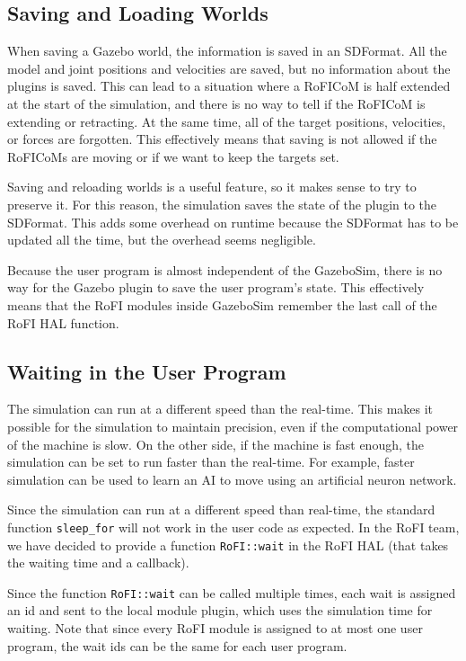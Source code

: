 \documentclass[
  printed, %
  color,   %
  notable, %
  oneside, %
  nolof,   %
  nolot,   %
  nocover,
]{fithesis3}
\newcommand{\code}[1]{\texttt{#1}}
\begin{document}
\subsection{Saving and Loading Worlds}

When saving a Gazebo world, the information is saved in an SDFormat.
All the model and joint positions and velocities are saved, but no information about the plugins is saved.
This can lead to a situation where a RoFICoM is half extended at the start of the simulation, and there is no way to tell if the RoFICoM is extending or retracting.
At the same time, all of the target positions, velocities, or forces are forgotten.
This effectively means that saving is not allowed if the RoFICoMs are moving or if we want to keep the targets set.

Saving and reloading worlds is a useful feature, so it makes sense to try to preserve it.
For this reason, the simulation saves the state of the plugin to the SDFormat.
This adds some overhead on runtime because the SDFormat has to be updated all the time, but the overhead seems negligible.

Because the user program is almost independent of the GazeboSim, there is no way for the Gazebo plugin to save the user program's state.
This effectively means that the RoFI modules inside GazeboSim remember the last call of the RoFI HAL function.

\subsection{Waiting in the User Program}

The simulation can run at a different speed than the real-time.
This makes it possible for the simulation to maintain precision, even if the computational power of the machine is slow.
On the other side, if the machine is fast enough, the simulation can be set to run faster than the real-time.
For example, faster simulation can be used to learn an AI to move using an artificial neuron network.

Since the simulation can run at a different speed than real-time, the standard function \code{sleep\_for} will not work in the user code as expected.
In the RoFI team, we have decided to provide a function \code{RoFI::wait} in the RoFI HAL (that takes the waiting time and a callback).

Since the function \code{RoFI::wait} can be called multiple times, each wait is assigned an id and sent to the local module plugin, which uses the simulation time for waiting.
Note that since every RoFI module is assigned to at most one user program, the wait ids can be the same for each user program.
\end{document}
